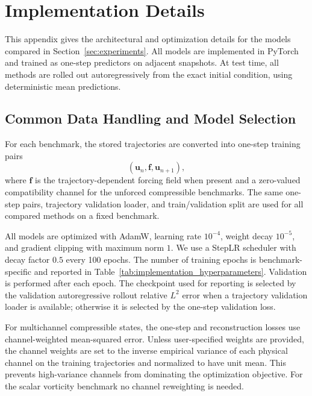 \documentclass[11pt]{article}
\begin{document}
\section{Implementation Details}\label{app:implementation_details}

This appendix gives the architectural and optimization details for the
models compared in Section~\ref{sec:experiments}. All models are implemented
in PyTorch and trained as one-step predictors on adjacent snapshots. At test
time, all methods are rolled out autoregressively from the exact initial
condition, using deterministic mean predictions.

\subsection{Common Data Handling and Model Selection}
For each benchmark, the stored trajectories are converted into one-step
training pairs
\[
    (\mathbf u_n,\mathbf f,\mathbf u_{n+1}),
\]
where $\mathbf f$ is the trajectory-dependent forcing field when present and a
zero-valued compatibility channel for the unforced compressible benchmarks. The
same one-step pairs, trajectory validation loader, and train/validation split
are used for all compared methods on a fixed benchmark.

All models are optimized with AdamW, learning rate $10^{-4}$, weight decay
$10^{-5}$, and gradient clipping with maximum norm $1$. We use a StepLR
scheduler with decay factor $0.5$ every 100 epochs. The number of training
epochs is benchmark-specific and reported in Table~\ref{tab:implementation_hyperparameters}.
Validation is performed after each epoch. The checkpoint used for reporting is
selected by the validation autoregressive rollout relative $L^2$ error when a
trajectory validation loader is available; otherwise it is selected by the
one-step validation loss.

For multichannel compressible states, the one-step and reconstruction losses
use channel-weighted mean-squared error. Unless user-specified weights are
provided, the channel weights are set to the inverse empirical variance of each
physical channel on the training trajectories and normalized to have unit mean.
This prevents high-variance channels from dominating the optimization objective.
For the scalar vorticity benchmark no channel reweighting is needed.
\end{document}
